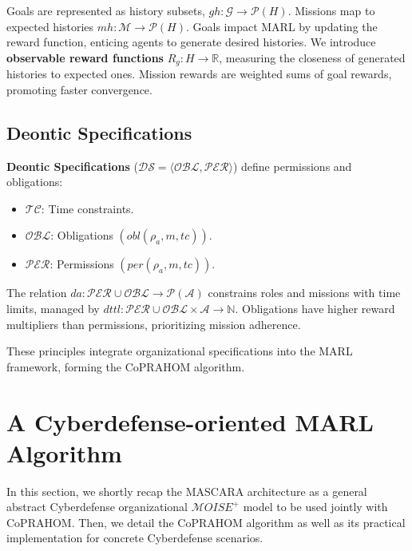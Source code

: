 Goals are represented as history subsets, $gh: \mathcal{G} \rightarrow \mathcal{P}(H)$. Missions map to expected histories $mh: \mathcal{M} \rightarrow \mathcal{P}(H)$. Goals impact MARL by updating the reward function, enticing agents to generate desired histories. We introduce \textbf{observable reward functions} $R_g: H \rightarrow \mathbb{R}$, measuring the closeness of generated histories to expected ones. Mission rewards are weighted sums of goal rewards, promoting faster convergence.

\subsection{Deontic Specifications}

\textbf{Deontic Specifications} ($\mathcal{DS} = \langle \mathcal{OBL}, \mathcal{PER} \rangle$) define permissions and obligations:
\begin{itemize}
  \item $\mathcal{TC}$: Time constraints.
  \item $\mathcal{OBL}$: Obligations $(obl(\rho_a, m, tc))$.
  \item $\mathcal{PER}$: Permissions $(per(\rho_a, m, tc))$.
\end{itemize}

The relation $da: \mathcal{PER} \cup \mathcal{OBL} \rightarrow \mathcal{P}(\mathcal{A})$ constrains roles and missions with time limits, managed by $dttl: \mathcal{PER} \cup \mathcal{OBL} \times \mathcal{A} \rightarrow \mathbb{N}$. Obligations have higher reward multipliers than permissions, prioritizing mission adherence.

These principles integrate organizational specifications into the MARL framework, forming the CoPRAHOM algorithm.

\section{A Cyberdefense-oriented MARL Algorithm}\label{sec:coprahom}

In this section, we shortly recap the MASCARA architecture as a general abstract Cyberdefense organizational $\mathcal{M}OISE^+$ model to be used jointly with CoPRAHOM.
Then, we detail the CoPRAHOM algorithm as well as its practical implementation for concrete Cyberdefense scenarios.

